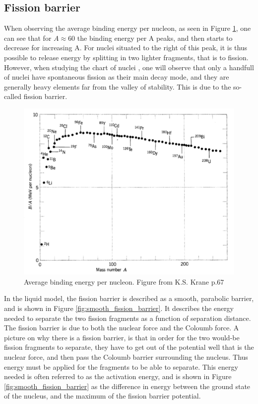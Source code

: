 \documentclass[]{article}
\begin{document}
\subsection{Fission barrier}
When observing the average binding energy per nucleon, as seen in Figure \ref{fig:binding_energy_per_nucleon}, one can see that for $A \approx 60$ the binding energy per A peaks, and then starts to decrease for increasing A. For nuclei situated to the right of this peak, it is thus possible to release energy by splitting in two lighter fragments, that is to fission. However, when studying the chart of nuclei , one will observe that only a handfull of nuclei have spontaneous fission as their main decay mode, and they are generally heavy elements far from the valley of stability. This  is due to the so-called fission barrier. 
\par
\vspace{3mm}

\begin{figure} [H]
	\centering
	\includegraphics[scale=0.6]{binding_energy_per_nucleon.png}
	\caption{Average binding energy per nucleon. Figure from K.S. Krane p.67 \cite{Krane1988}}
	\label{fig:binding_energy_per_nucleon}
\end{figure}


 \noindent In the liquid model, the fission barrier is described as a smooth, parabolic barrier, and is shown in Figure \ref{fig:smooth_fission_barrier}. It describes the energy needed to separate the two fission fragments as a function of separation distance. The fission barrier is due to both the nuclear force and the Coloumb force. A picture on why there is a fission barrier, is that in order for the two would-be fission fragments to separate, they have to get out of the potential well that is the nuclear force, and then pass the Coloumb barrier surrounding the nucleus. Thus energy must be applied for the fragments to be able to separate. This energy needed is often referred to as the activation energy, and is shown in Figure \ref{fig:smooth_fission_barrier} as the difference in energy between the ground state of the nucleus, and the maximum of the fission barrier potential. 
 
\end{document}
